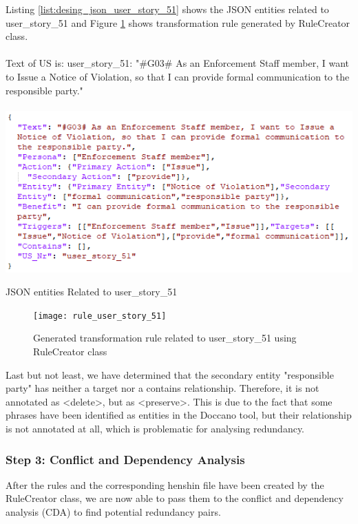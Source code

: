 \begin{example}
	Listing \ref{list:desing_json_user_story_51} shows the JSON entities related to user\_story\_51 and Figure \ref{fig:desing_rule_user_story_51} shows transformation rule generated by RuleCreator class.\\\\
	Text of US is:
	user\_story\_51: "\#G03\# As an Enforcement Staff member, I want to Issue a Notice of Violation, so that I can provide formal communication to the responsible party."
	\begin{MyListing}
		\paragraph{}
		\centering
		\includegraphics[scale=0.8]{Listing/json_user_story_51.png}
		\caption{JSON entities Related to user\_story\_51}\label{list:desing_json_user_story_51}
	\end{MyListing}
	\begin{figure}[h]
		\centering
		\texttt{[image: rule\_user\_story\_51]}
		\caption{Generated transformation rule related to user\_story\_51 using RuleCreator class}\label{fig:desing_rule_user_story_51}
	\end{figure}
	Last but not least, we have determined that the secondary entity "responsible party" has neither a target nor a contains relationship. Therefore, it is not annotated as \textless delete\textgreater, but as \textless preserve\textgreater. This is due to the fact that some phrases have been identified as entities in the Doccano tool, but their relationship is not annotated at all, which is problematic for analysing redundancy.
\end{example}
\subsubsection*{Step 3: Conflict and Dependency Analysis}\label{step_3}
After the rules and the corresponding henshin file have been created by the RuleCreator class, we are now able to pass them to the conflict and dependency analysis (CDA) to find potential redundancy pairs.

